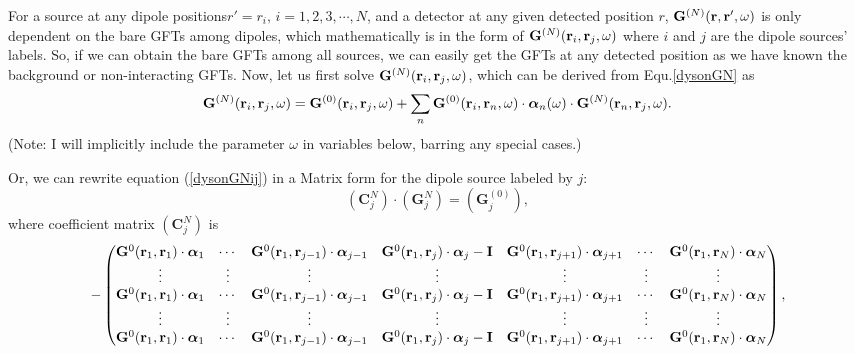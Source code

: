 For a source at any dipole positions$r'=r_i,\, i=1,2,3,\cdots,N$, and a detector at any given detected position $r$, $\mathbf{G}^{(N)}(\mathbf{r},\mathbf{r}',\omega)$ is only dependent on the bare GFTs among dipoles, which mathematically is in the form of $\mathbf{G}^{(N)}(\mathbf{r}_i,\mathbf{r}_j,\omega)$ where $i$ and $j$ are the dipole sources' labels. So, if we can obtain the bare GFTs among all sources, we can easily get the GFTs at any detected position as we have known the background or non-interacting GFTs. Now, let us first solve $\mathbf{G}^{(N)}(\mathbf{r}_i,\mathbf{r}_j,\omega)$, which can be derived from Equ.\eqref{dysonGN} as
\begin{equation}
\label{dysonGNij}
 \mathbf{G}^{(N)}(\mathbf{r}_i,\mathbf{r}_j,\omega)=\mathbf{G}^{(0)}(\mathbf{r}_i,\mathbf{r}_j,\omega)+\sum_n{\mathbf{G}^{(0)}(\mathbf{r}_i,\mathbf{r}_n,\omega)\cdot {\bm \alpha}_n(\omega) \cdot \mathbf{G}^{(N)}(\mathbf{r}_n,\mathbf{r}_j,\omega)}.
\end{equation}
(Note: I will implicitly include the parameter $\omega$ in variables below, barring any special cases.)

Or, we can rewrite equation (\ref{dysonGNij}) in a Matrix form for the dipole source labeled by $j$:
\begin{equation}
 \label{dysonMatGN}
\left(\mathbf{C}^N_j\right)\cdot(\mathbf{G}^N _j)=(\mathbf{G}^{(0)} _j),
\end{equation}
where coefficient matrix $\left(\mathbf{C}^N_j\right)$ is
{\tiny
\begin{equation}
-\begin{pmatrix}
\mathbf{G}^0(\mathbf{r}_1,\mathbf{r}_1)\cdot {\bm \alpha}_1 & \cdots & \mathbf{G}^0(\mathbf{r}_1,\mathbf{r}_{j-1})\cdot {\bm \alpha}_{j-1} & \mathbf{G}^0(\mathbf{r}_1,\mathbf{r}_j)\cdot {\bm \alpha}_j-\mathbf{I} & \mathbf{G}^0(\mathbf{r}_1,\mathbf{r}_{j+1})\cdot {\bm \alpha}_{j+1} & \cdots & \mathbf{G}^0(\mathbf{r}_1,\mathbf{r}_N)\cdot {\bm \alpha}_N\\
           \vdots & \vdots & \vdots & \vdots & \vdots & \vdots & \vdots \\
\mathbf{G}^0(\mathbf{r}_1,\mathbf{r}_1)\cdot {\bm \alpha}_1 & \cdots & \mathbf{G}^0(\mathbf{r}_1,\mathbf{r}_{j-1})\cdot {\bm \alpha}_{j-1} & \mathbf{G}^0(\mathbf{r}_1,\mathbf{r}_j)\cdot {\bm \alpha}_j-\mathbf{I} & \mathbf{G}^0(\mathbf{r}_1,\mathbf{r}_{j+1})\cdot {\bm \alpha}_{j+1} & \cdots & \mathbf{G}^0(\mathbf{r}_1,\mathbf{r}_N)\cdot {\bm \alpha}_N\\
           \vdots & \vdots & \vdots & \vdots & \vdots & \vdots & \vdots \\
\mathbf{G}^0(\mathbf{r}_1,\mathbf{r}_1)\cdot {\bm \alpha}_1 & \cdots & \mathbf{G}^0(\mathbf{r}_1,\mathbf{r}_{j-1})\cdot {\bm \alpha}_{j-1} & \mathbf{G}^0(\mathbf{r}_1,\mathbf{r}_j)\cdot {\bm \alpha}_j-\mathbf{I} & \mathbf{G}^0(\mathbf{r}_1,\mathbf{r}_{j+1})\cdot {\bm \alpha}_{j+1} & \cdots & \mathbf{G}^0(\mathbf{r}_1,\mathbf{r}_N)\cdot {\bm \alpha}_N\\
\end{pmatrix},
\end{equation}
}

